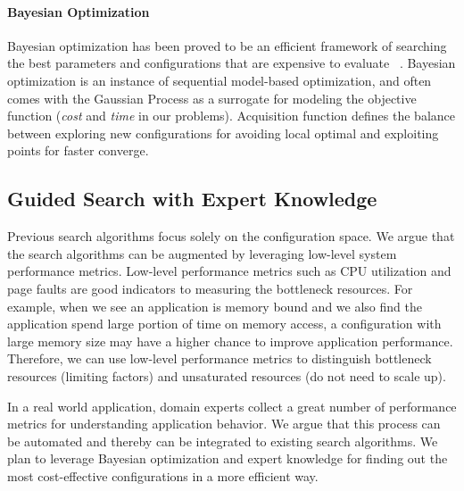 \paragraph*{Bayesian Optimization}
Bayesian optimization has been proved to be an efficient framework
of searching the best parameters and configurations
that are expensive to evaluate
~\cite{Klein2016, Alipourfard2017}.
Bayesian optimization is an instance of sequential model-based optimization,
and  often comes with the Gaussian Process
as a surrogate for modeling the objective function
(\emph{cost} and \emph{time} in our problems).
Acquisition function defines the balance between
exploring new configurations for avoiding local optimal
and
exploiting points for faster converge.



\subsection{Guided Search with Expert Knowledge}

Previous search algorithms focus solely on the configuration space.
We argue that the search algorithms can be augmented
by leveraging low-level system performance metrics.
Low-level performance metrics
such as CPU utilization and page faults are good indicators
to measuring the bottleneck resources.
For example, when we see an application is memory bound and
we also find the application spend large portion of time on memory access,
a configuration with large memory size may have a higher chance to improve
application performance.
Therefore, we can use low-level performance metrics
to distinguish bottleneck resources (limiting factors)
and
unsaturated resources (do not need to scale up).

In a real world application, domain experts collect
a great number of performance metrics for understanding application behavior.
We argue that this process can be automated and thereby can be integrated
to existing search algorithms.
We plan to leverage Bayesian optimization and expert knowledge
for finding out the most cost-effective configurations
in a more efficient way.


\iffalse
  - Our approach leverage Bayesian Optimization and expert's knowledge
  - Bayesian optimization to reduce evaluation cost {[}CherryPick{]}
  - Expert's strategy (low-level performance metrcis) {[}FABOLAS,
  Inside-Out{]}
  - (Saturated resources) Limiting factors needs to be identified
  - (Unsaturated resources) are not that important
  - CDP inforation for knowing the trade-off (exploration or exploitation)
\fi


